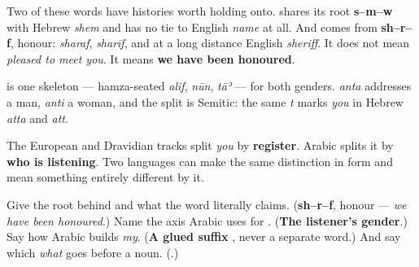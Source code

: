 Two of these words have histories worth holding onto. \textbf{} shares its root \textbf{s–m–w} with Hebrew \emph{shem} and has no tie to English \emph{name} at all. And \textbf{} comes from \textbf{sh–r–f}, honour: \emph{sharaf}, \emph{sharīf}, and at a long distance English \emph{sheriff}. It does not mean \emph{pleased to meet you}. It means \textbf{we have been honoured}.

\begin{grammarlens}[title={Grammar Lens: which axis splits you}]
\textbf{} is one skeleton — hamza-seated \emph{alif}, \emph{nūn}, \emph{tāʾ} — for both genders. \textbf{} \emph{anta} addresses a man, \textbf{} \emph{anti} a woman, and the split is Semitic: the same \emph{t} marks \emph{you} in Hebrew \emph{atta} and \emph{att}.

The European and Dravidian tracks split \emph{you} by \textbf{register}. Arabic splits it by \textbf{who is listening}. Two languages can make the same distinction in form and mean something entirely different by it.
\end{grammarlens}

\begin{tcolorbox}[breakable,colback=teal!4,colframe=teal!35!black,title={Before you move on}]
Give the root behind \textbf{} and what the word literally claims. (\textbf{sh–r–f}, honour — \emph{we have been honoured}.) Name the axis Arabic uses for \textbf{}. (\textbf{The listener's gender}.) Say how Arabic builds \emph{my}. (\textbf{A glued suffix }, never a separate word.) And say which \emph{what} goes before a noun. (\textbf{}.)
\end{tcolorbox}
